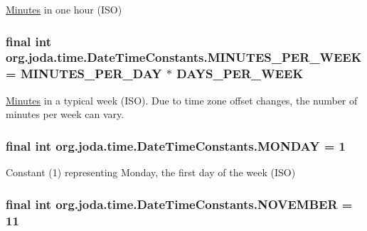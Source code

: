 \hyperlink{classorg_1_1joda_1_1time_1_1_minutes}{Minutes} in one hour (I\-S\-O) \hypertarget{classorg_1_1joda_1_1time_1_1_date_time_constants_a24d3a1fca4ee933195432a72de602d97}{
\subsubsection[{M\-I\-N\-U\-T\-E\-S\-\_\-\-P\-E\-R\-\_\-\-W\-E\-E\-K}]{\setlength{\rightskip}{0pt plus 5cm}final int org.\-joda.\-time.\-Date\-Time\-Constants.\-M\-I\-N\-U\-T\-E\-S\-\_\-\-P\-E\-R\-\_\-\-W\-E\-E\-K = {\bf M\-I\-N\-U\-T\-E\-S\-\_\-\-P\-E\-R\-\_\-\-D\-A\-Y} $\ast$ {\bf D\-A\-Y\-S\-\_\-\-P\-E\-R\-\_\-\-W\-E\-E\-K}\hspace{0.3cm}{\ttfamily [static]}}}\label{classorg_1_1joda_1_1time_1_1_date_time_constants_a24d3a1fca4ee933195432a72de602d97}
\hyperlink{classorg_1_1joda_1_1time_1_1_minutes}{Minutes} in a typical week (I\-S\-O). Due to time zone offset changes, the number of minutes per week can vary. \hypertarget{classorg_1_1joda_1_1time_1_1_date_time_constants_a016345942d565c4e924d7cb5666659e0}{
\subsubsection[{M\-O\-N\-D\-A\-Y}]{\setlength{\rightskip}{0pt plus 5cm}final int org.\-joda.\-time.\-Date\-Time\-Constants.\-M\-O\-N\-D\-A\-Y = 1\hspace{0.3cm}{\ttfamily [static]}}}\label{classorg_1_1joda_1_1time_1_1_date_time_constants_a016345942d565c4e924d7cb5666659e0}
Constant (1) representing Monday, the first day of the week (I\-S\-O) \hypertarget{classorg_1_1joda_1_1time_1_1_date_time_constants_a1309010fe57642c28d0e2648fce2bfdd}{
\subsubsection[{N\-O\-V\-E\-M\-B\-E\-R}]{\setlength{\rightskip}{0pt plus 5cm}final int org.\-joda.\-time.\-Date\-Time\-Constants.\-N\-O\-V\-E\-M\-B\-E\-R = 11\hspace{0.3cm}{\ttfamily [static]}}}\label{classorg_1_1joda_1_1time_1_1_date_time_constants_a1309010fe57642c28d0e2648fce2bfdd}
